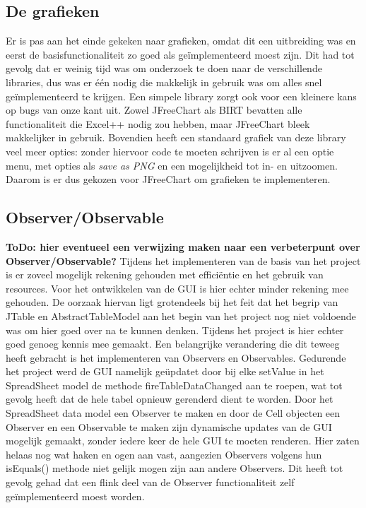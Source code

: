 \documentclass[a4paper,11pt]{article}
\begin{document}
\subsection{De grafieken}
Er is pas aan het einde gekeken naar grafieken, omdat dit een uitbreiding was en eerst de basisfunctionaliteit zo goed als geïmplementeerd moest zijn. Dit had tot gevolg dat er weinig tijd was om onderzoek te doen naar de verschillende libraries, dus was er één nodig die makkelijk in gebruik was om alles snel geïmplementeerd te krijgen. Een simpele library zorgt ook voor een kleinere kans op bugs van onze kant uit. Zowel JFreeChart als BIRT bevatten alle functionaliteit die Excel++ nodig zou hebben, maar JFreeChart bleek makkelijker in gebruik. Bovendien heeft een standaard grafiek van deze library veel meer opties: zonder hiervoor code te moeten schrijven is er al een optie menu, met opties als \textit{save as PNG} en een mogelijkheid tot in- en uitzoomen. Daarom is er dus gekozen voor JFreeChart om grafieken te implementeren.

\subsection{Observer/Observable} \textbf{ToDo: hier eventueel een verwijzing maken naar een verbeterpunt over Observer/Observable?}
Tijdens het implementeren van de basis van het project is er zoveel mogelijk rekening gehouden met efficiëntie en het gebruik van resources. Voor het ontwikkelen van de GUI is hier echter minder rekening mee gehouden. De oorzaak hiervan ligt grotendeels bij het feit dat het begrip van JTable en AbstractTableModel aan het begin van het project nog niet voldoende was om hier goed over na te kunnen denken. Tijdens het project is hier echter goed genoeg kennis mee gemaakt. Een belangrijke verandering die dit teweeg heeft gebracht is het implementeren van Observers en Observables. Gedurende het project werd de GUI namelijk geüpdatet door bij elke setValue in het SpreadSheet model de methode fireTableDataChanged aan te roepen, wat tot gevolg heeft dat de hele tabel opnieuw gerenderd dient te worden. Door het SpreadSheet data model een Observer te maken en door de Cell objecten een Observer en een Observable te maken zijn dynamische updates van de GUI mogelijk gemaakt, zonder iedere keer de hele GUI te moeten renderen. Hier zaten helaas nog wat haken en ogen aan vast, aangezien Observers volgens hun isEquals() methode niet gelijk mogen zijn aan andere Observers. Dit heeft tot gevolg gehad dat een flink deel van de Observer functionaliteit zelf geïmplementeerd moest worden.
\end{document}
